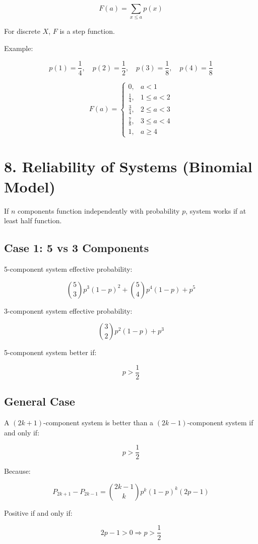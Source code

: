 \documentclass[12pt]{article}
\begin{document}
\[
F(a)=\sum_{x\le a}p(x)
\]

For discrete $X$, $F$ is a step function.

Example:

\[
p(1)=\frac14,\quad
p(2)=\frac12,\quad
p(3)=\frac18,\quad
p(4)=\frac18
\]

\[
F(a)=
\begin{cases}
0, & a<1 \\
\frac14, & 1\le a<2 \\
\frac34, & 2\le a<3 \\
\frac78, & 3\le a<4 \\
1, & a\ge4
\end{cases}
\]

\section*{8. Reliability of Systems (Binomial Model)}

If $n$ components function independently with probability $p$, system works if at least half function.

\subsection*{Case 1: 5 vs 3 Components}

5-component system effective probability:

\[
\binom{5}{3}p^3(1-p)^2
+\binom{5}{4}p^4(1-p)
+p^5
\]

3-component system effective probability:

\[
\binom{3}{2}p^2(1-p)
+p^3
\]

5-component system better if:

\[
p>\frac12
\]

\subsection*{General Case}

A $(2k+1)$-component system is better than a $(2k-1)$-component system if and only if:

\[
p>\frac12
\]

Because:

\[
P_{2k+1}-P_{2k-1}
=
\binom{2k-1}{k}
p^k(1-p)^k(2p-1)
\]

Positive if and only if:

\[
2p-1>0
\Rightarrow
p>\frac12
\]
\end{document}
